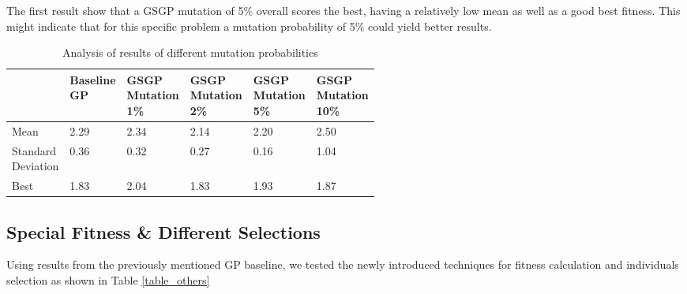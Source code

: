 \documentclass[12pt]{article}
\begin{document}
The first result show that a GSGP mutation of 5\% overall scores the best, having a relatively low mean as well as a good best fitness. This might indicate that for this specific problem a mutation probability of 5\% could yield better results.

\begin{table}[h!]
\centering
\footnotesize
\begin{tabular}{l || l l l l l}
 \hline
  & \shortstack{Baseline \\ GP} & \shortstack{GSGP \\ Mutation \\ 1\%} & \shortstack{GSGP \\Mutation \\ 2\%} & \shortstack{GSGP \\Mutation \\ 5\%}  & \shortstack{GSGP \\Mutation \\ 10\%}  \\
 \hline\hline
 Mean & 2.29 & 2.34 & \cellcolor{green!25}2.14 & 2.20 & \cellcolor{red!25}2.50
 \\
 \shortstack{Standard \\ Deviation}  & 0.36 & 0.32 & 0.27 & \cellcolor{green!25}0.16 & \cellcolor{red!25}1.04 \\
 Best & \cellcolor{green!25}1.83 & 2.04 &  \cellcolor{green!25}1.83 & \cellcolor{red!25}1.93 & 1.87 \\
 \hline
\end{tabular}
\label{Table to test captions and labels}
\caption{Analysis of results of different mutation probabilities}
\label{table}
\end{table}


\subsection*{Special Fitness \& Different Selections}
Using results from the previously mentioned GP baseline, we tested the newly introduced techniques for fitness calculation and individuals selection as shown in Table  \ref{table_others}
\end{document}

